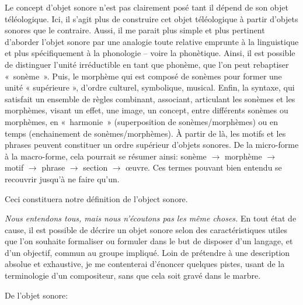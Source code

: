 Le concept d'objet sonore n'est pas clairement posé tant il dépend de son objet téléologique. Ici, il s'agit plus de construire cet objet téléologique à partir d'objets sonores que le contraire.   
Aussi, il me parait plus simple et plus pertinent d'aborder l'objet sonore par une analogie toute relative emprunte à la linguistique et plus spécifiquement à la phonologie -- voire la phonètique. Ainsi, il est possible de distinguer l'unité irréductible en tant que phonème, que l'on peut rebaptiser \hbox{« sonème »}. Puis, le morphème qui est composé de sonèmes pour former une unité « supérieure », d'ordre culturel, symbolique, musical. Enfin, la syntaxe, qui satisfait un ensemble de règles combinant, associant, articulant les sonèmes et les morphèmes, visant un effet, une image, un concept, entre différents sonèmes ou morphèmes, en \hbox{« harmonie »} (superposition de sonèmes/morphèmes) ou en temps (enchainement de sonèmes/morphèmes). À partir de là, les motifs et les phrases peuvent constituer un ordre supérieur d'objets sonores. De la micro-forme à la macro-forme, cela pourrait se résumer ainsi:
sonème $\rightarrow$ morphème $\rightarrow$ motif $\rightarrow$ phrase $\rightarrow$ section $\rightarrow$ œuvre. Ces termes pouvant bien entendu se recouvrir jusqu'à ne faire qu'un.

Ceci constituera notre définition de l'object sonore.
\bigskip

\textit
{Nous entendons tous, mais nous n'écoutons pas les même choses.}
En tout état de cause, il est possible de décrire un objet sonore selon des caractéristiques utiles que l'on souhaite formaliser ou formuler dans le but de disposer d'un langage, et d'un objectif, commun au groupe impliqué. Loin de prétendre à une description absolue et exhaustive, je me contenterai d'énoncer quelques pistes, usant de la terminologie d'un compositeur, sans que cela soit gravé dans le marbre. 
\bigskip

De l'objet sonore:

